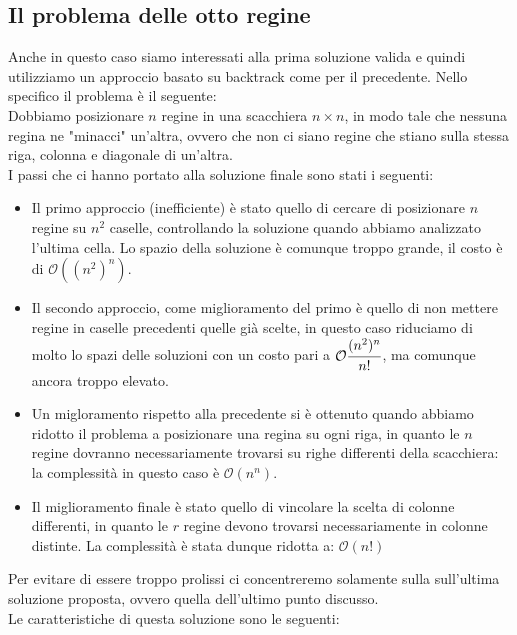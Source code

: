 \documentclass[../cheatSheetAlgoritmi.tex]{subfiles}
\begin{document}
\subsection{Il problema delle otto regine}
Anche in questo caso siamo interessati alla prima soluzione valida e quindi utilizziamo un approccio basato su backtrack come per il precedente. 
Nello specifico il problema è il seguente: \\
Dobbiamo posizionare $n$ regine in una scacchiera $n \times n$, in modo tale che nessuna regina ne "minacci" un'altra, ovvero che non ci siano regine che stiano sulla stessa riga, colonna e diagonale di un'altra.\\
I passi che ci hanno portato alla soluzione finale sono stati i seguenti:
\begin{itemize}
	\item Il primo approccio (inefficiente) è stato quello di cercare di posizionare $n$ regine su $n^2$ caselle, controllando la soluzione quando abbiamo analizzato l'ultima cella. Lo spazio della soluzione è comunque troppo grande, il costo è di $\mathcal{O}((n^2)^n)$.
	\item Il secondo approccio, come miglioramento del primo è quello di non mettere regine in caselle precedenti quelle già scelte, in questo caso riduciamo di molto lo spazi delle soluzioni con un costo pari a  $\mathcal{O}\cfrac{(n^2)^n}{n!}$, ma comunque ancora troppo elevato.
	\item Un migloramento rispetto alla precedente si è ottenuto quando abbiamo ridotto il problema a posizionare una regina su ogni riga, in quanto le $n$ regine dovranno necessariamente trovarsi su righe differenti della scacchiera: la complessità in questo caso è $\mathcal{O}(n^n)$.
	\item Il miglioramento finale è stato quello di vincolare la scelta di colonne differenti, in quanto le $r$ regine devono trovarsi necessariamente in colonne distinte. La complessità è stata dunque ridotta a: $\mathcal{O}(n!)$
\end{itemize}
Per evitare di essere troppo prolissi ci concentreremo solamente sulla sull'ultima soluzione proposta, ovvero quella dell'ultimo punto discusso. \\
Le caratteristiche di questa soluzione sono le seguenti: 
\end{document}
